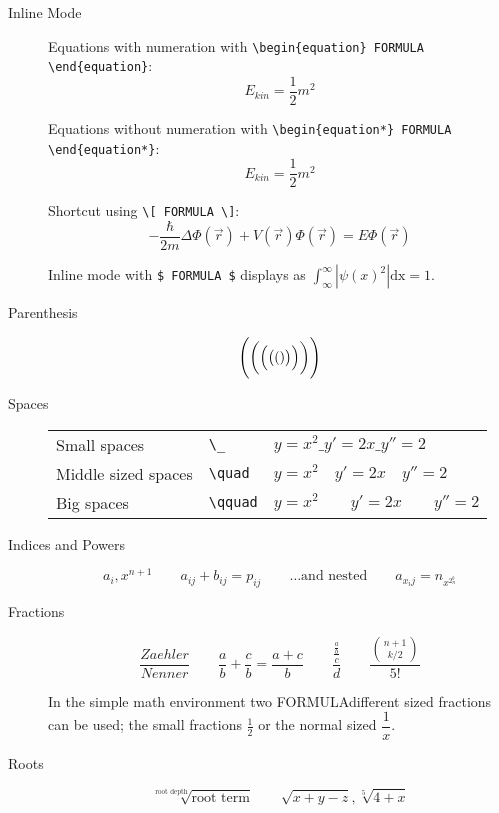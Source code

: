 \documentclass[10pt,a4paper]{scrartcl}
\begin{document}
\begin{description}

\item[Inline Mode]
Equations with numeration with \verb$\begin{equation} FORMULA \end{equation}$:
\begin{equation} 
E_{kin} = \frac 1 2 m^2
\end{equation}

Equations without numeration with \verb$\begin{equation*} FORMULA \end{equation*}$:
\begin{equation*} 
E_{kin} = \frac 1 2 m^2
\end{equation*}

Shortcut using \verb$\[ FORMULA \]$:
\[ -\frac{\hbar}{2m}\Delta\Phi(\vec r) + V(\vec r)\Phi(\vec r) = E\Phi(\vec r) \]

Inline mode with \verb|$ FORMULA $| displays as 
$\int_\infty^\infty |\psi(x)^2|\mathrm{dx} = 1$.

\item[Parenthesis]
\[ \Biggl( \biggl( \Bigl( \bigl( ( ) \bigr) \Bigr) \biggr) \Biggr) \]

\item[Spaces]
\begin{tabular}[t]{lll}
Small spaces        & \verb$\_$     & $ y=x^{2} \_ y'=2x \_  y''=2 $ \\
Middle sized spaces & \verb$\quad$  & $ y=x^{2} \quad y'=2x \quad  y''=2 $ \\
Big spaces          & \verb$\qquad$ & $ y=x^{2} \qquad y'=2x \qquad  y''=2 $
\end{tabular}

\item[Indices and Powers]
\[ a_i, x^{n+1} \qquad a_{ij} + b_{ij} = p_{ij} \qquad 
    \text{\ldots and nested} \qquad
    a_{x_ij} = n_{x^{2^b_n}} \]

\item[Fractions]
\[  \frac{Zaehler}{Nenner} \qquad 
    \frac{a}{b} + \frac{c}{b} = \frac{ a+c}{b} \qquad
    \frac{\frac{\frac{a}{b}}{c}}{d} \qquad
    \frac {{n+1 \choose k/2}} {5!} \]

\noindent In the simple math environment two FORMULAdifferent sized fractions can be 
used; the small fractions $\frac{1}{2}$ or the normal sized $\dfrac{1}{x}$.

\item[Roots]	
\[  \sqrt[\text{root depth}]{\text{root term}} \qquad
    \sqrt{x+y-z}, \sqrt[5]{4+x} \]
		

\end{description}
\end{document}
